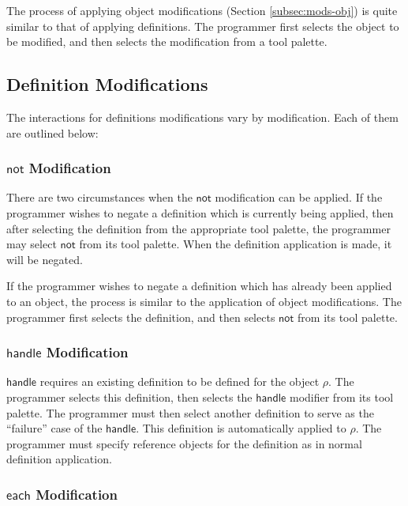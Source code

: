 \documentclass[twoside,openright,11pt]{report}
\begin{document}
The process of applying object modifications (Section \ref{subsec:mods-obj}) is quite similar to that of applying definitions.
The programmer first selects the object to be modified, and then selects the modification from a tool palette.

\subsection{Definition Modifications}
\label{subsec:mod-def}

The interactions for definitions modifications vary by modification.
Each of them are outlined below:

\subsubsection{$\mathsf{not}$ Modification}

There are two circumstances when the $\mathsf{not}$ modification can be applied. 
If the programmer wishes to negate a definition which is currently being applied, then after selecting the definition from the appropriate tool palette, the programmer may select $\mathsf{not}$ from its tool palette.
When the definition application is made, it will be negated.

If the programmer wishes to negate a definition which has already been applied to an object, the process is similar to the application of object modifications.
The programmer first selects the definition, and then selects $\mathsf{not}$ from its tool palette.

\subsubsection{$\mathsf{handle}$ Modification}

$\mathsf{handle}$ requires an existing definition to be defined for the object $\rho$. 
The programmer selects this definition, then selects the $\mathsf{handle}$ modifier from its tool palette.
The programmer must then select another definition to serve as the ``failure'' case of the $\mathsf{handle}$. 
This definition is automatically applied to $\rho$. 
The programmer must specify reference objects for the definition as in normal definition application.

\subsubsection{$\mathsf{each}$ Modification}
\end{document}
